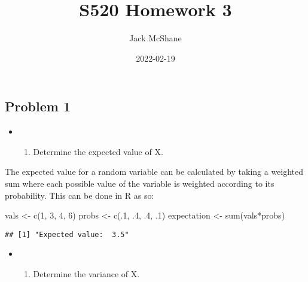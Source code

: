 \documentclass[
]{article}
\title{S520 Homework 3}
\author{Jack McShane}
\date{2022-02-19}
\newenvironment{Shaded}{\begin{snugshade}}{\end{snugshade}}
\newcommand{\DecValTok}[1]{\textcolor[rgb]{0.00,0.00,0.81}{#1}}
\newcommand{\FunctionTok}[1]{\textcolor[rgb]{0.00,0.00,0.00}{#1}}
\newcommand{\NormalTok}[1]{#1}
\newcommand{\OtherTok}[1]{\textcolor[rgb]{0.56,0.35,0.01}{#1}}
\newcommand{\SpecialCharTok}[1]{\textcolor[rgb]{0.00,0.00,0.00}{#1}}
\providecommand{\tightlist}{%
  \setlength{\itemsep}{0pt}\setlength{\parskip}{0pt}}
\begin{document}
\maketitle

\hypertarget{problem-1}{%
\subsection{Problem 1}\label{problem-1}}

\begin{itemize}
\item
  \begin{enumerate}
  \def\labelenumi{\alph{enumi})}
  \setcounter{enumi}{2}
  \tightlist
  \item
    Determine the expected value of X.
  \end{enumerate}
\end{itemize}

\begin{center}
    The expected value for a random variable can be calculated by taking a
    weighted sum where each possible value of the variable is weighted according
    to its probability. This can be done in R as so:
\end{center}

\begin{Shaded}
\begin{Highlighting}[]
\NormalTok{vals }\OtherTok{\textless{}{-}} \FunctionTok{c}\NormalTok{(}\DecValTok{1}\NormalTok{, }\DecValTok{3}\NormalTok{, }\DecValTok{4}\NormalTok{, }\DecValTok{6}\NormalTok{)}
\NormalTok{probs }\OtherTok{\textless{}{-}} \FunctionTok{c}\NormalTok{(.}\DecValTok{1}\NormalTok{, .}\DecValTok{4}\NormalTok{, .}\DecValTok{4}\NormalTok{, .}\DecValTok{1}\NormalTok{)}
\NormalTok{expectation }\OtherTok{\textless{}{-}} \FunctionTok{sum}\NormalTok{(vals}\SpecialCharTok{*}\NormalTok{probs)}
\end{Highlighting}
\end{Shaded}

\begin{verbatim}
## [1] "Expected value:  3.5"
\end{verbatim}

\hfill\break

\begin{itemize}
\item
  \begin{enumerate}
  \def\labelenumi{\alph{enumi})}
  \setcounter{enumi}{3}
  \tightlist
  \item
    Determine the variance of X.
  \end{enumerate}
\end{itemize}
\end{document}

